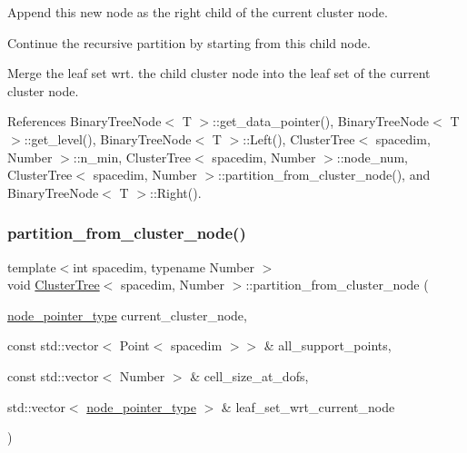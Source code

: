 Append this new node as the right child of the current cluster node.

Continue the recursive partition by starting from this child node.

Merge the leaf set wrt. the child cluster node into the leaf set of the current cluster node.

References Binary\+Tree\+Node$<$ T $>$\+::get\+\_\+data\+\_\+pointer(), Binary\+Tree\+Node$<$ T $>$\+::get\+\_\+level(), Binary\+Tree\+Node$<$ T $>$\+::\+Left(), Cluster\+Tree$<$ spacedim, Number $>$\+::n\+\_\+min, Cluster\+Tree$<$ spacedim, Number $>$\+::node\+\_\+num, Cluster\+Tree$<$ spacedim, Number $>$\+::partition\+\_\+from\+\_\+cluster\+\_\+node(), and Binary\+Tree\+Node$<$ T $>$\+::\+Right().

\mbox{\label{classClusterTree_a8b853c36834044df5283fca9e03d39d2}} 
\subsubsection{\texorpdfstring{partition\+\_\+from\+\_\+cluster\+\_\+node()}{partition\_from\_cluster\_node()}\hspace{0.1cm}{\footnotesize\ttfamily [3/3]}}
{\footnotesize\ttfamily template$<$int spacedim, typename Number $>$ \\
void \hyperlink{classClusterTree}{Cluster\+Tree}$<$ spacedim, Number $>$\+::partition\+\_\+from\+\_\+cluster\+\_\+node (\begin{DoxyParamCaption}\item[{\hyperlink{classClusterTree_ae4bb0fdc7ac559d7844d04a00ab3e9de}{node\+\_\+pointer\+\_\+type}}]{current\+\_\+cluster\+\_\+node,  }\item[{const std\+::vector$<$ Point$<$ spacedim $>$$>$ \&}]{all\+\_\+support\+\_\+points,  }\item[{const std\+::vector$<$ Number $>$ \&}]{cell\+\_\+size\+\_\+at\+\_\+dofs,  }\item[{std\+::vector$<$ \hyperlink{classClusterTree_ae4bb0fdc7ac559d7844d04a00ab3e9de}{node\+\_\+pointer\+\_\+type} $>$ \&}]{leaf\+\_\+set\+\_\+wrt\+\_\+current\+\_\+node }\end{DoxyParamCaption})\hspace{0.3cm}{\ttfamily [private]}}

